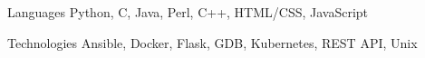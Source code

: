 

\begin{cvskills}

  \cvskill
    {Languages} %
    {Python, C, Java, Perl, C++, HTML/CSS, JavaScript} %

  \cvskill
    {Technologies} %
    {Ansible, Docker, Flask, GDB, Kubernetes, REST API, Unix} %

\end{cvskills}
